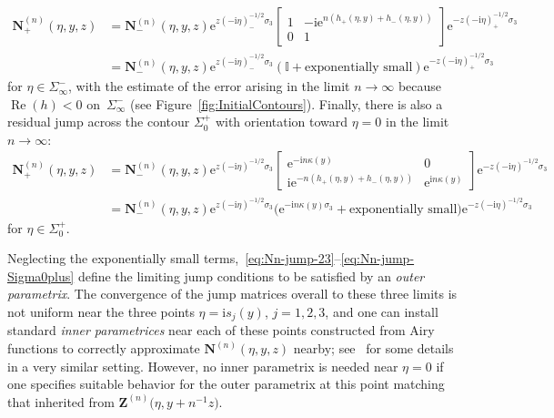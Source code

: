 \documentclass[pdftex]{sigma}
\numberwithin{equation}{section}
\begin{document}
\begin{align*}
\mathbf{N}^{(n)}_+(\eta,y,z)&=\mathbf{N}^{(n)}_-(\eta,y,z)\mathrm{e}^{z(-\mathrm{i}\eta)^{-1/2}_-\sigma_3}\begin{bmatrix}1&-\mathrm{i}\mathrm{e}^{n(h_+(\eta,y)+h_-(\eta,y))}\\0 & 1\end{bmatrix}\mathrm{e}^{-z(-\mathrm{i}\eta)^{-1/2}_+\sigma_3}\\ &=
\mathbf{N}^{(n)}_-(\eta,y,z)\mathrm{e}^{z(-\mathrm{i}\eta)^{-1/2}_-\sigma_3}\left(\mathbb{I} + \text{exponentially small}\right)\mathrm{e}^{-z(-\mathrm{i}\eta)^{-1/2}_+\sigma_3}
\end{align*}
for $\eta\in\Sigma_\infty^-$, with the estimate of the error arising in the limit $n\to\infty$ because $\operatorname{Re}(h)<0$ on~$\Sigma_\infty^-$ (see Figure~\ref{fig:InitialContours}). Finally, there is also a residual jump across the contour $\Sigma_0^+$ with orientation toward $\eta=0$ in the limit $n\to\infty$:
\begin{align}
\mathbf{N}^{(n)}_+(\eta,y,z)&=\mathbf{N}^{(n)}_-(\eta,y,z)\mathrm{e}^{z(-\mathrm{i}\eta)^{-1/2}\sigma_3}\begin{bmatrix}
\mathrm{e}^{-\mathrm{i} n \kappa(y)} & 0 \\
\mathrm{i}\mathrm{e}^{-n(h_+(\eta,y)+h_-(\eta,y))} & \mathrm{e}^{\mathrm{i} n\kappa(y)}
\end{bmatrix}\mathrm{e}^{-z(-\mathrm{i}\eta)^{-1/2}\sigma_3}\label{eq:Nn-jump-Sigma0plus}
\\
&=\mathbf{N}^{(n)}_-(\eta,y,z)\mathrm{e}^{z(-\mathrm{i}\eta)^{-1/2}\sigma_3}\bigl(\mathrm{e}^{-\mathrm{i} n\kappa(y)\sigma_3} + \text{exponentially small}\bigr)\mathrm{e}^{-z(-\mathrm{i}\eta)^{-1/2}\sigma_3}\nonumber
\end{align}
for $\eta\in\Sigma_0^+$.

Neglecting the exponentially small terms,~\eqref{eq:Nn-jump-23}--\eqref{eq:Nn-jump-Sigma0plus} define the limiting jump conditions to be satisfied by an \emph{outer parametrix}. The convergence of the jump matrices overall to these three limits is not uniform near the three points $\eta=\mathrm{i} s_j(y)$, $j=1,2,3$, and one can
install standard \emph{inner parametrices} near each of these points constructed from Airy functions to correctly approximate $\mathbf{N}^{(n)}(\eta,y,z)$ nearby; see~\cite[Section 4.4.2]{BuckinghamM22} for some details in a very similar setting. However, no inner parametrix is needed near $\eta=0$ if one specifies suitable behavior for the outer parametrix at this point matching that inherited from $\mathbf{Z}^{(n)}\bigl(\eta,y+n^{-1}z\bigr)$.
\end{document}
